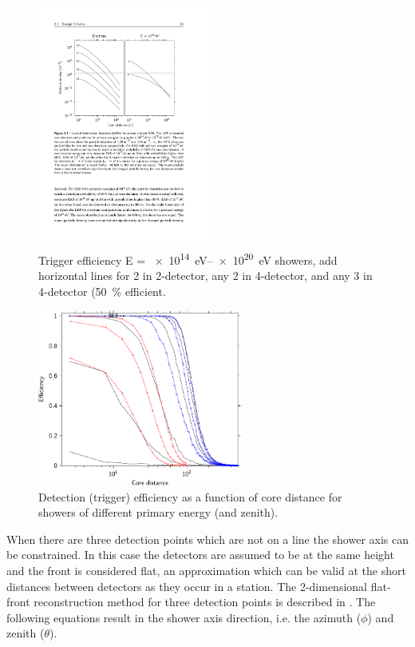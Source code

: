 \begin{figure}
    \centering
    \includegraphics[width=0.5\textwidth]
                    {plots/station/ldf_energies}
    \caption{Trigger efficiency E = \SIrange{e14}{e20}{\eV} showers, add horizontal lines for 2 in 2-detector, any 2 in 4-detector, and any 3 in 4-detector (\SI{50}{\percent} efficient.}
    \label{fig:ldf_energies2}
\end{figure}

\begin{figure}
    \centering
    \includegraphics[width=0.6\textwidth]
                    {plots/station/efficiency_two_16}
    \caption{Detection (trigger) efficiency as a function of core distance for showers of different primary energy (and zenith).}
    \label{fig:efficiency_two_16}
\end{figure}

When there are three detection points which are not on a line the shower axis can be constrained. In this case the detectors are assumed to be at the same height and the front is considered flat, an approximation which can be valid at the short distances between detectors as they occur in a station. The 2-dimensional flat-front reconstruction method for three detection points is described in \cite{fokkema2012hisparc}. The following equations result in the shower axis direction, i.e. the azimuth ($\phi$) and zenith ($\theta$).

